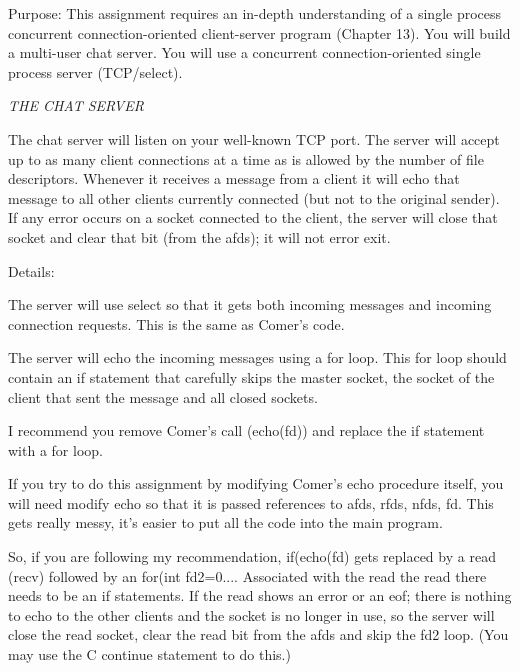 

\parindent 0pt

Purpose: This assignment requires an in-depth understanding of
a single process concurrent connection-oriented client-server program 
(Chapter 13).
You will build a multi-user chat server.
You will use a concurrent connection-oriented single process server 
(TCP/select).

{\it THE CHAT SERVER}

The chat server will listen on your well-known TCP port.
The server will accept up to as many client connections at a time as is
allowed by the number of file descriptors.
Whenever it receives a message from a client it will echo that message
to all other clients currently connected (but not to the original sender).
If any error occurs on a socket connected to the client,
the server will close that socket and clear that bit (from the {\ltt{}afds});
it will not error exit.

Details:

The server will use select so that it gets both incoming
messages and incoming connection requests.
This is the same as Comer's code.

The server will echo the incoming messages using a for loop.
This for loop should contain
an if statement that carefully skips the master socket, the socket of the
client that sent the message and all closed sockets.

I recommend you remove Comer's call ({\ltt{}echo(fd)}) and
replace the {\ltt{}if} statement with a {\ltt{}for} loop.

If you try to do this assignment by modifying Comer's {\ltt{}echo}
procedure itself, you will need modify {\ltt{}echo} so that it is passed
references to {\ltt{}afds}, {\ltt{}rfds}, {\ltt{}nfds}, {\ltt{}fd}.
This gets really messy, it's easier to put all the code
into the main program.

So, if you are following my recommendation,
{\ltt{}if(echo(fd)} gets replaced by a {\ltt{}read} ({\ltt{}recv})
followed by an {\ltt{}for(int fd2=0...}.
Associated with the read the read there needs to be an {\ltt{}if} statements.
If the read shows an error or an eof; there is nothing
to echo to the other clients and the socket is no longer in use,
so the server will close the read socket, clear
the read bit from the {\ltt{}afds} and skip the {\ltt{}fd2} loop.
(You may use the C {\ltt{}continue} statement to do this.)

